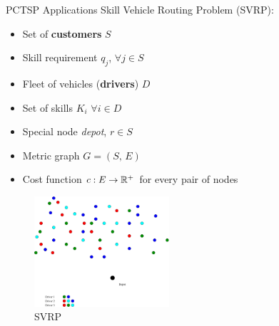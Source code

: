 \begin{frame}[t]{PCTSP Applications}
    Skill Vehicle Routing Problem (SVRP):
    \begin{minipage}[t]{0.48\textwidth}
        \begin{itemize}
            \item<1-> Set of \textbf{customers} $S$
            \item<2-> Skill requirement $q_j$,  $\forall j \in S$
            \item<3-> Fleet of vehicles (\textbf{drivers}) $D$
            \item<4-> Set of skills $K_i$ $\forall i \in D$
            \item<5-> Special node \emph{depot}, $r \in S$
            \item<6-> Metric graph $G = (S, \, E)$
            \item<7-> Cost function $c:E \rightarrow \mathbb{R}^+$ for every pair of nodes
        \end{itemize}
    \end{minipage}
    \begin{minipage}[t]{0.48\textwidth}
        \begin{figure}
            \centering
            \includegraphics[width=5cm]{VRPSS01.pdf}
            \caption{SVRP}
            \label{fig:VRPSS01}
        \end{figure}            
    \end{minipage}
\end{frame}

